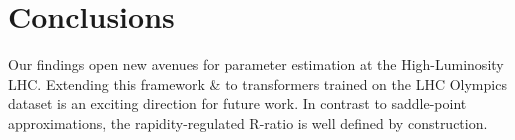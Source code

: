 \section{Conclusions}\label{sec:conclusions}

Our findings open new avenues for parameter estimation at the
High-Luminosity LHC. Extending this framework & to transformers trained on
the LHC Olympics dataset is an exciting direction for future work. In
contrast to saddle-point approximations, the rapidity-regulated R-ratio
is well defined by construction.

